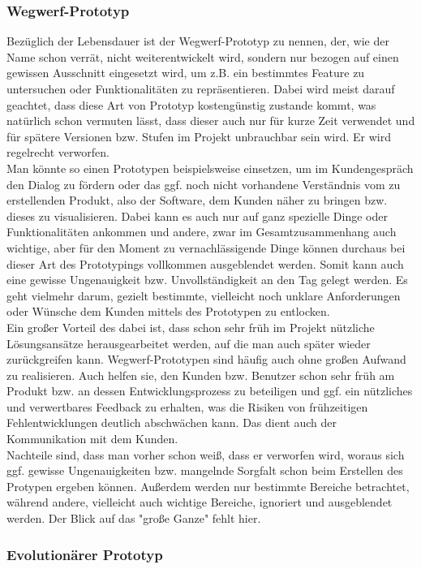 \documentclass{swp1}
\begin{document}
\subsubsection*{Wegwerf-Prototyp}
Bezüglich der Lebensdauer ist der Wegwerf-Prototyp zu nennen, der, wie der Name schon verrät, nicht weiterentwickelt wird, sondern nur bezogen auf einen gewissen Ausschnitt eingesetzt wird, um z.B. ein bestimmtes Feature zu untersuchen oder Funktionalitäten zu repräsentieren. Dabei wird meist darauf geachtet, dass diese Art von Prototyp kostengünstig zustande kommt, was natürlich schon vermuten lässt, dass dieser auch nur für kurze Zeit verwendet und für spätere Versionen bzw. Stufen im Projekt unbrauchbar sein wird. Er wird regelrecht verworfen.\\
Man könnte so einen Prototypen beispielsweise einsetzen, um im Kundengespräch den Dialog zu fördern oder das ggf. noch nicht vorhandene Verständnis vom zu erstellenden Produkt, also der Software, dem Kunden näher zu bringen bzw. dieses zu visualisieren. Dabei kann es auch nur auf ganz spezielle Dinge oder Funktionalitäten ankommen und andere, zwar im Gesamtzusammenhang auch wichtige, aber für den Moment zu vernachlässigende Dinge können durchaus bei dieser Art des Prototypings vollkommen ausgeblendet werden. Somit kann auch eine gewisse Ungenauigkeit bzw. Unvollständigkeit an den Tag gelegt werden. Es geht vielmehr darum, gezielt bestimmte, vielleicht noch unklare Anforderungen oder Wünsche dem Kunden mittels des Prototypen zu entlocken.\\
Ein großer Vorteil des dabei ist, dass schon sehr früh im Projekt nützliche Lösungsansätze herausgearbeitet werden, auf die man auch später wieder zurückgreifen kann. Wegwerf-Prototypen sind häufig auch ohne großen Aufwand zu realisieren. Auch helfen sie, den Kunden bzw. Benutzer schon sehr früh am Produkt bzw. an dessen Entwicklungsprozess zu beteiligen und ggf. ein nützliches und verwertbares Feedback zu erhalten, was die Risiken von frühzeitigen Fehlentwicklungen deutlich abschwächen kann. Das dient auch der Kommunikation mit dem Kunden.\\
Nachteile sind, dass man vorher schon weiß, dass er verworfen wird, woraus sich ggf. gewisse Ungenauigkeiten bzw. mangelnde Sorgfalt schon beim Erstellen des Protypen ergeben können. Außerdem werden nur bestimmte Bereiche betrachtet, während andere, vielleicht auch wichtige Bereiche, ignoriert und ausgeblendet werden. Der Blick auf das "große Ganze" fehlt hier.

\subsubsection*{Evolutionärer Prototyp}
\end{document}
